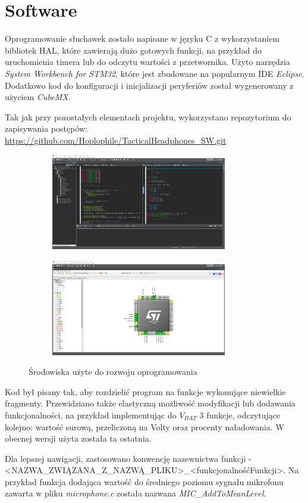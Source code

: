 \chapter{Software}
\label{cha:software}

Oprogramowanie słuchawek zostało napisane w języku C z wykorzystaniem bibliotek HAL, które zawierają dużo gotowych funkcji, na przykład do uruchomienia timera lub do odczytu wartości z przetwornika. Użyto narzędzia \textit{System Workbench for STM32}, które jest zbudowane na popularnym IDE \textit{Eclipse}. Dodatkowo kod do konfiguracji i inicjalizacji peryferiów został wygenerowany z użyciem \textit{CubeMX}.

Tak jak przy pozostałych elementach projektu, wykorzystano repozytorium do zapisywania postępów: \url{https://github.com/Hoplophile/TacticalHeadphones_SW.git}

\begin{figure}[H]
	\centering
	\begin{subfigure}{.48\textwidth}
		\centering
		\includegraphics[height=4.2cm]{zdjecia/eclipse.png}
	\end{subfigure}
	\begin{subfigure}{.48\textwidth}
		\centering
		\includegraphics[height=4.2cm]{zdjecia/cubemx.png}
	\end{subfigure}
	\caption{\label{pic:IDE} Środowiska użyte do rozwoju oprogramowania}
\end{figure}

Kod był pisany tak, aby rozdzielić program na funkcje wykonujące niewielkie fragmenty. Przewidziano także elastyczną możliwość modyfikacji lub dodawania funkcjonalności, na przykład implementując do $V_{BAT}$ 3 funkcje, odczytujące kolejno: wartość surową, przeliczoną na Volty oraz procenty naładowania. W obecnej wersji użyta została ta ostatnia.

Dla lepszej nawigacji, zastosowano konwencję nazewnictwa funkcji - <NAZWA\_ZWIĄZANA\_Z\_NAZWĄ\_PLIKU>\_<funkcjonalnośćFunkcji>. Na przykład funkcja dodająca wartość do średniego poziomu sygnału mikrofonu zawarta w pliku \textit{microphone.c} została nazwana \textit{MIC\_AddToMeanLevel}.